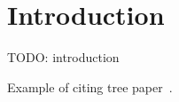 \section{Introduction} \label{sec:intro}
TODO: introduction

Example of citing tree paper~\cite{yunits2017tree}.

